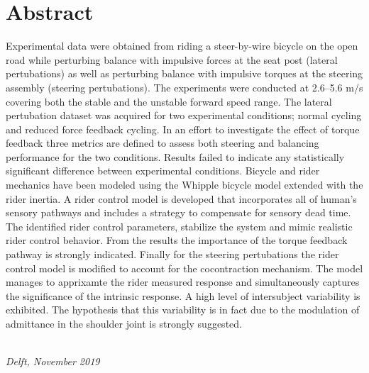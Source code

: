 \chapter*{Abstract}\label{chap:abstract}

 Experimental data were obtained from riding a steer-by-wire bicycle on the open road  while perturbing balance with impulsive forces at the seat post (lateral pertubations) as well as perturbing balance with impulsive torques at the steering assembly (steering pertubations). The experiments were conducted at 2.6–5.6 m/s covering both the stable and the unstable forward speed range. The lateral pertubation  dataset was acquired for two experimental conditions; normal cycling and reduced force feedback cycling. In an effort to investigate the effect of torque feedback  three metrics are defined to assess both steering and balancing performance for the two conditions. Results failed to indicate any statistically significant difference between experimental conditions. Bicycle and rider  mechanics have been modeled using the Whipple bicycle model extended with the rider inertia. A rider control model is developed that incorporates all of human's sensory pathways and includes a strategy to compensate for sensory dead time. The identified rider control parameters, stabilize the system and mimic realistic rider control behavior. From the results the importance of the torque feedback pathway is strongly indicated. Finally for the steering pertubations the rider control model is modified to account for the cocontraction mechanism. The model  manages to apprixamte the rider measured response  and simultaneously captures the significance of the intrinsic response. A high level of intersubject variability is exhibited. The hypothesis that this variability is in fact due to the modulation of admittance in the shoulder joint is strongly suggested.


\begin{flushright}
{\makeatletter\itshape
    \@author \\
    Delft, November 2019
\makeatother}
\end{flushright}
